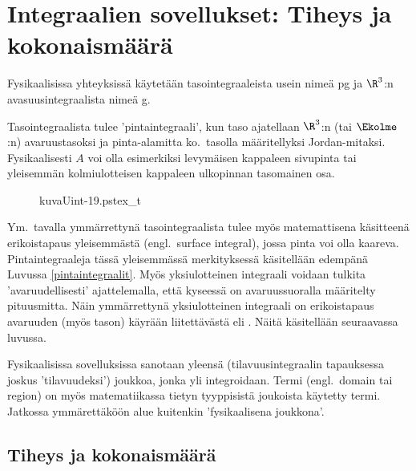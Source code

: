 \section[Integraalien sovellukset: Tiheys ja kokonaismäärä]
{Integraalien sovellukset: Tiheys ja  \\ kokonaismäärä} 
\label{pinta- ja tilavuusintegraalit}
\alku

Fysikaalisissa yhteyksissä käytetään tasointegraaleista usein nimeä 
pg ja $\R^3$:n avasuusintegraalista nimeä 
g. 
\begin{multicols}{2}
Tasointegraalista tulee 'pintaintegraali', kun taso ajatellaan $\R^3$:n (tai $\Ekolme$:n)
avaruustasoksi ja pinta-alamitta ko.\ tasolla määritellyksi Jordan-mitaksi. Fysikaalisesti $A$
voi olla esimerkiksi levymäisen kappaleen sivupinta tai yleisemmän kolmiulotteisen kappaleen
ulkopinnan tasomainen osa.  
\begin{figure}[H]
\begin{center}
{kuvaUint-19.pstex_t}
\end{center}
\end{figure}
\end{multicols}
Ym.\ tavalla  ymmärrettynä tasointegraalista tulee myös matemattisena käsitteenä erikoistapaus 
yleisemmästä  (engl.\ surface integral), jossa pinta voi olla kaareva.
Pintaintegraaleja tässä yleisemmässä merkityksessä käsitellään edempänä Luvussa 
\ref{pintaintegraalit}. Myös yksiulotteinen integraali voidaan tulkita 'avaruudellisesti'
ajattelemalla, että kyseessä on avaruussuoralla määritelty pituusmitta. Näin ymmärrettynä 
yksiulotteinen integraali on erikoistapaus avaruuden (myös tason) käyrään liitettävästä 
 eli . Näitä käsitellään seuraavassa luvussa.

Fysikaalisissa sovelluksissa sanotaan yleensä  (tilavuusintegraalin tapauksessa
joskus 'tilavuudeksi') joukkoa, jonka yli integroidaan. Termi  (engl.\ domain tai 
region) on myös matematiikassa tietyn tyyppisistä joukoista käytetty termi. Jatkossa 
ymmärettäköön alue kuitenkin 'fysikaalisena joukkona'.
 
\subsection*{Tiheys ja kokonaismäärä}
 

